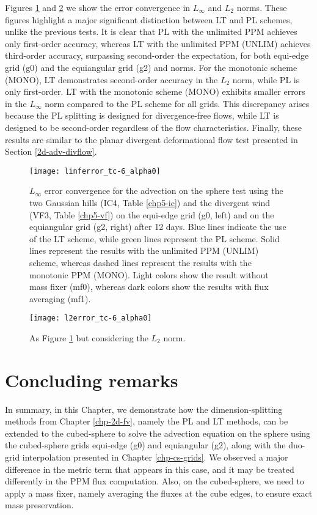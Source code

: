 Figures \ref{chp-advcs-sec-exp-adv4-linf} and \ref{chp-advcs-sec-exp-adv4-l2} we show the error convergence in $L_{\infty}$ and $L_{2}$ norms.
These figures highlight a major significant distinction between LT and PL schemes, unlike the previous tests.
It is clear that PL with the unlimited PPM achieves only first-order accuracy, whereas LT with the unlimited PPM (UNLIM) achieves third-order accuracy, 
surpassing second-order the expectation, for both equi-edge grid (g0) and the equiangular grid (g2) and norms.
For the monotonic  scheme (MONO), LT demonstrates second-order accuracy in the $L_2$ norm, while PL is only first-order.
LT with the monotonic scheme (MONO) exhibits smaller errors in the $L_{\infty}$ norm compared to the PL scheme for all grids.
This discrepancy arises because the PL splitting is designed for divergence-free flows, while LT is designed to be second-order regardless of the flow characteristics.
Finally, these results are similar to the planar divergent deformational flow test presented in Section \ref{2d-adv-divflow}.

\newpage

\begin{figure}[!htb]
	\centering
	\texttt{[image: linferror\_tc-6\_alpha0]}
	\caption{
		$L_{\infty}$ error convergence for the advection on the sphere test using the two Gaussian hills  (IC4, Table \ref{chp5-ic}) and the divergent wind
		(VF3, Table \ref{chp5-vf}) on the equi-edge grid (g0, left) 
		and on the equiangular grid (g2, right) after 12 days.
		Blue lines indicate the use of the LT scheme, while green lines represent the PL scheme.
		Solid lines represent the results with the unlimited PPM (UNLIM) scheme, whereas dashed lines represent the results with the monotonic PPM (MONO).
		Light colors show the result without mass fixer (mf0), whereas dark colors show the results with flux averaging (mf1).
	\label{chp-advcs-sec-exp-adv4-linf}}
\end{figure}

\begin{figure}[!htb]
	\centering
	\texttt{[image: l2error\_tc-6\_alpha0]}
	\caption{As Figure \ref{chp-advcs-sec-exp-adv4-linf} but considering the $L_2$ norm. \label{chp-advcs-sec-exp-adv4-l2}}
\end{figure}

\newpage
\section{Concluding remarks}
\label{chp-cs-conc}
In summary, in this Chapter, we demonstrate how the dimension-splitting methods from Chapter \ref{chp-2d-fv}, 
namely the PL and LT methods, can be extended to the cubed-sphere to solve the advection equation on the sphere 
using the cubed-sphere grids equi-edge (g0) and equiangular (g2), along with the duo-grid interpolation presented in Chapter \ref{chp-cs-grids}.
We observed a major difference in the metric term that appears in this case, and it may be treated differently in the PPM flux computation.
Also, on the cubed-sphere, we need to apply a mass fixer, namely averaging the fluxes at the cube edges, to ensure exact mass preservation.


